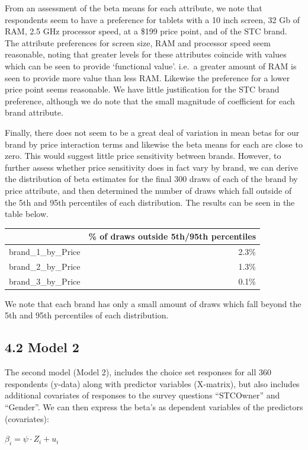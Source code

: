\documentclass[]{article}
\begin{document}
From an assessment of the beta means for each attribute, we note that
respondents seem to have a preference for tablets with a 10 inch screen,
32 Gb of RAM, 2.5 GHz processor speed, at a \$199 price point, and of
the STC brand. The attribute preferences for screen size, RAM and
processor speed seem reasonable, noting that greater levels for these
attributes coincide with values which can be seen to provide `functional
value'. i.e.~a greater amount of RAM is seen to provide more value than
less RAM. Likewise the preference for a lower price point seems
reasonable. We have little justification for the STC brand preference,
although we do note that the small magnitude of coefficient for each
brand attribute.

Finally, there does not seem to be a great deal of variation in mean
betas for our brand by price interaction terms and likewise the beta
means for each are close to zero. This would suggest little price
sensitivity between brands. However, to further assess whether price
sensitivity does in fact vary by brand, we can derive the distribution
of beta estimates for the final 300 draws of each of the brand by price
attribute, and then determined the number of draws which fall outside of
the 5th and 95th percentiles of each distribution. The results can be
seen in the table below.

\begin{longtable}[]{@{}lr@{}}
\toprule
& \% of draws outside 5th/95th percentiles\tabularnewline
\midrule
\endhead
brand\_1\_by\_Price & 2.3\%\tabularnewline
brand\_2\_by\_Price & 1.3\%\tabularnewline
brand\_3\_by\_Price & 0.1\%\tabularnewline
\bottomrule
\end{longtable}

We note that each brand has only a small amount of draws which fall
beyond the 5th and 95th percentiles of each distribution.

\subsection{4.2 Model 2}\label{model-2}

The second model (Model 2), includes the choice set responses for all
360 respondents (y-data) along with predictor variables (X-matrix), but
also includes additional covariates of responses to the survey questions
``STCOwner'' and ``Gender''. We can then express the beta's as dependent
variables of the predictors (covariates):

\(\beta_{i} = \psi \cdot Z_{i} + u_{i}\)
\end{document}
